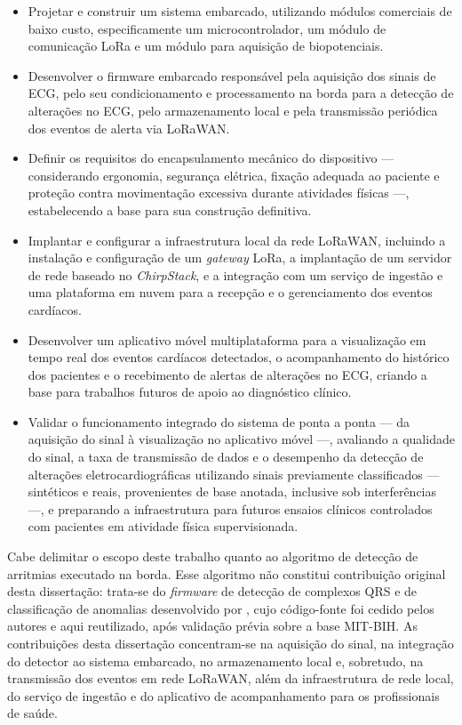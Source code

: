 \begin{itemize}
    \item Projetar e construir um sistema embarcado, utilizando módulos comerciais de baixo custo, especificamente um microcontrolador, um módulo de comunicação LoRa e um módulo para aquisição de biopotenciais.

    \item Desenvolver o firmware embarcado responsável pela aquisição dos sinais de ECG, pelo seu condicionamento e processamento na borda para a detecção de alterações no ECG, pelo armazenamento local e pela transmissão periódica dos eventos de alerta via LoRaWAN.

    \item Definir os requisitos do encapsulamento mecânico do dispositivo — considerando ergonomia, segurança elétrica, fixação adequada ao paciente e proteção contra movimentação excessiva durante atividades físicas —, estabelecendo a base para sua construção definitiva.

    \item Implantar e configurar a infraestrutura local da rede LoRaWAN, incluindo a instalação e configuração de um \textit{gateway} LoRa, a implantação de um servidor de rede baseado no \textit{ChirpStack}, e a integração com um serviço de ingestão e uma plataforma em nuvem para a recepção e o gerenciamento dos eventos cardíacos.

    \item Desenvolver um aplicativo móvel multiplataforma para a visualização em tempo real dos eventos cardíacos detectados, o acompanhamento do histórico dos pacientes e o recebimento de alertas de alterações no ECG, criando a base para trabalhos futuros de apoio ao diagnóstico clínico.

    \item Validar o funcionamento integrado do sistema de ponta a ponta — da aquisição do sinal à visualização no aplicativo móvel —, avaliando a qualidade do sinal, a taxa de transmissão de dados e o desempenho da detecção de alterações eletrocardiográficas utilizando sinais previamente classificados — sintéticos e reais, provenientes de base anotada, inclusive sob interferências —, e preparando a infraestrutura para futuros ensaios clínicos controlados com pacientes em atividade física supervisionada.
\end{itemize}

Cabe delimitar o escopo deste trabalho quanto ao algoritmo de detecção de arritmias executado na borda. Esse algoritmo não constitui contribuição original desta dissertação: trata-se do \textit{firmware} de detecção de complexos QRS e de classificação de anomalias desenvolvido por , cujo código-fonte foi cedido pelos autores e aqui reutilizado, após validação prévia sobre a base MIT-BIH. As contribuições desta dissertação concentram-se na aquisição do sinal, na integração do detector ao sistema embarcado, no armazenamento local e, sobretudo, na transmissão dos eventos em rede LoRaWAN, além da infraestrutura de rede local, do serviço de ingestão e do aplicativo de acompanhamento para os profissionais de saúde.


